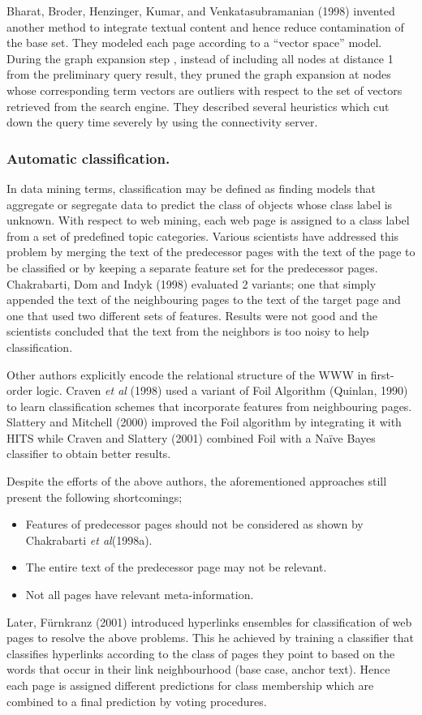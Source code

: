 \documentclass{article}
\begin{document}
Bharat, Broder, Henzinger, Kumar, and Venkatasubramanian (1998) invented another method to integrate textual content and hence reduce contamination of the base set. They modeled each page according to a “vector space” model. During the graph expansion step , instead of  including all nodes at distance 1 from the preliminary query result, they pruned the graph expansion at nodes whose corresponding term vectors are outliers with respect to the set of vectors retrieved from the search engine. They described several heuristics which cut down the query time severely by using the connectivity server. 
\subsubsection{ Automatic classification.}
In data mining terms, classification may be defined as finding models that aggregate or segregate data to predict the class of objects whose class label is unknown. With respect to web mining, each web page is assigned to a class label from a set of predefined topic categories. Various scientists have addressed this problem by merging the text of the predecessor pages with the text of the page to be classified or by keeping a separate feature set for the predecessor pages. Chakrabarti, Dom and Indyk (1998) evaluated 2 variants; one that simply appended the text  of the neighbouring pages to the text of the target page and one that used two different sets of features. Results were not good and the scientists concluded that the text from the neighbors is too noisy to help classification.

 Other authors explicitly encode the relational structure of the WWW in first-order logic. Craven \textit{et al} (1998) used a variant of Foil Algorithm (Quinlan, 1990) to learn classification schemes that incorporate features from neighbouring pages. Slattery and Mitchell (2000) improved the Foil algorithm by integrating it with HITS while Craven and Slattery (2001) combined Foil with a Naïve Bayes classifier to obtain better results.

Despite the efforts of the above authors, the aforementioned approaches still present the following shortcomings;
\begin{itemize}
\item Features of predecessor pages should not be considered as shown by Chakrabarti \textit{et al}(1998a).
\item The entire text of the predecessor page may not be relevant.
\item Not all pages have relevant meta-information.
\end{itemize}
Later, Fürnkranz (2001) introduced hyperlinks ensembles for classification of web pages to resolve the above problems. This he achieved by training  a classifier that classifies hyperlinks according to the class of pages they point to  based on the words that occur in their link neighbourhood (base case, anchor text). Hence each page is assigned different predictions for class membership which are combined to a final prediction by voting procedures.
\end{document}
